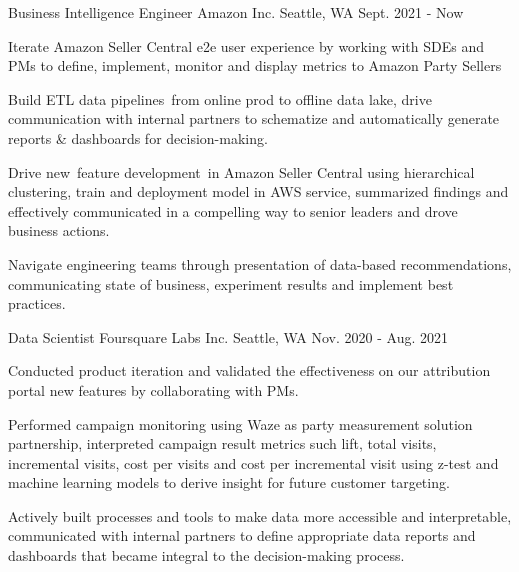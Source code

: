 



\begin{cventries}


	\cventry
	{Business Intelligence Engineer} %
	{Amazon Inc.} %
	{Seattle, WA} %
	{Sept. 2021 - Now} %
	{
		\begin{cvitems}
			\item{Iterate Amazon Seller Central e2e user experience by working with SDEs and PMs to define, implement, monitor and display metrics to Amazon  Party Sellers}
			\item{Build ETL data pipelines from online prod to offline data lake, drive communication with internal partners to schematize and automatically generate reports \& dashboards for decision-making.}
			\item{Drive new feature development in Amazon Seller Central using hierarchical clustering, train and deployment model in AWS service, summarized findings and effectively communicated in a compelling way to senior leaders and drove business actions.}
			\item{Navigate engineering teams through presentation of data-based recommendations, communicating state of business, experiment results and implement best practices.}
		\end{cvitems}
	}


	\cventry
	{Data Scientist} %
	{Foursquare Labs Inc.} %
	{Seattle, WA} %
	{Nov. 2020 - Aug. 2021} %
	{
		\begin{cvitems}
			\item{Conducted product iteration and validated the effectiveness on our attribution portal new features by collaborating with PMs.}
			\item{Performed campaign monitoring using Waze as  party measurement solution partnership, interpreted campaign result metrics such lift, total visits, incremental visits, cost per visits and cost per incremental visit using z-test and machine learning models to derive insight for future customer targeting.}
			\item{Actively built processes and tools to make data more accessible and interpretable, communicated with internal partners to define appropriate data reports and dashboards that became integral to the decision-making process.}
		\end{cvitems}
	}


\end{cventries}

